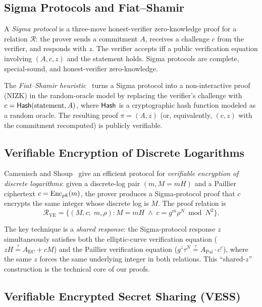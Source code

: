 \subsection{Sigma Protocols and Fiat--Shamir}\label{sec:bg-sigma}

A \emph{Sigma protocol} is a three-move honest-verifier zero-knowledge proof for a relation $\mathcal{R}$: the prover sends a commitment $A$, receives a challenge $c$ from the verifier, and responds with $z$. The verifier accepts iff a public verification equation involving $(A, c, z)$ and the statement holds. Sigma protocols are complete, special-sound, and honest-verifier zero-knowledge.

The \emph{Fiat--Shamir heuristic}~\cite{fiat1987prove} turns a Sigma protocol into a non-interactive proof (NIZK) in the random-oracle model by replacing the verifier's challenge with $c = \mathsf{Hash}(\text{statement}, A)$, where $\mathsf{Hash}$ is a cryptographic hash function modeled as a random oracle. The resulting proof $\pi = (A, z)$ (or, equivalently, $(c, z)$ with the commitment recomputed) is publicly verifiable.

\subsection{Verifiable Encryption of Discrete Logarithms}\label{sec:bg-vedl}

Camenisch and Shoup~\cite{camenisch2003verifiable} give an efficient protocol for \emph{verifiable encryption of discrete logarithms}: given a discrete-log pair $(m, M = mH)$ and a Paillier ciphertext $c = \mathrm{Enc}_{pk}(m)$, the prover produces a Sigma-protocol proof that $c$ encrypts the same integer whose discrete log is $M$. The proof relation is
$$
\mathcal{R}_{\mathrm{VE}} = \{(M, c;\; m, \rho) : M = mH \;\land\; c = g^m \rho^N \bmod N^2\}.
$$

The key technique is a \emph{shared response}: the Sigma-protocol response $z$ simultaneously satisfies both the elliptic-curve verification equation ($zH \stackrel{?}{=} A_{\mathrm{EC}} + cM$) and the Paillier verification equation ($g^z\tau^N \stackrel{?}{=} A_{\mathrm{Pai}} \cdot c^c$), where the same $z$ forces the same underlying integer in both relations. This ``shared-$z$'' construction is the technical core of our proofs.

\subsection{Verifiable Encrypted Secret Sharing (VESS)}\label{sec:bg-vess}


